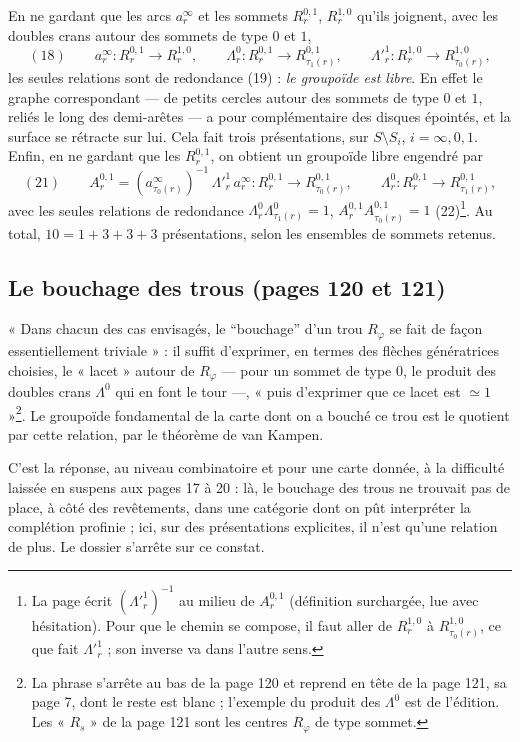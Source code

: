 \documentclass[11pt,a4paper]{article}
\begin{document}
En ne gardant que les arcs $a^\infty_r$ et les sommets $R^{0,1}_r$,
$R^{1,0}_r$ qu'ils joignent, avec les doubles crans autour des sommets de type
$0$ et $1$,
\[
(18)\qquad a^\infty_r : R^{0,1}_r \to R^{1,0}_r, \qquad \Lambda^0_r : R^{0,1}_r \to R^{0,1}_{\tau_1(r)}, \qquad \Lambda'^1_r : R^{1,0}_r \to R^{1,0}_{\tau_0(r)},
\]
les seules relations sont de redondance (19) : \emph{le groupoïde est libre}.
En effet le graphe correspondant — de petits cercles autour des sommets de type
$0$ et $1$, reliés le long des demi-arêtes — a pour complémentaire des disques
épointés, et la surface se rétracte sur lui. Cela fait trois présentations, sur
$S \setminus S_i$, $i = \infty, 0, 1$. Enfin, en ne gardant que les
$R^{0,1}_r$, on obtient un groupoïde libre engendré par
\[
(21)\qquad A^{0,1}_r = (a^\infty_{\tau_0(r)})^{-1}\,\Lambda'^1_r\,a^\infty_r : R^{0,1}_r \to R^{0,1}_{\tau_0(r)}, \qquad \Lambda^0_r : R^{0,1}_r \to R^{0,1}_{\tau_1(r)},
\]
avec les seules relations de redondance $\Lambda^0_r\Lambda^0_{\tau_1(r)} = 1$,
$A^{0,1}_r A^{0,1}_{\tau_0(r)} = 1$ (22)\footnote{La page écrit
$(\Lambda'^1_r)^{-1}$ au milieu de $A^{0,1}_r$ (définition surchargée, lue
avec hésitation). Pour que le chemin se compose, il faut aller de $R^{1,0}_r$
à $R^{1,0}_{\tau_0(r)}$, ce que fait $\Lambda'^1_r$ ; son inverse va dans
l'autre sens.}. Au total, $10 = 1 + 3 + 3 + 3$ présentations, selon les
ensembles de sommets retenus.

\subsection*{Le bouchage des trous (pages 120 et 121)}

« Dans chacun des cas envisagés, le “bouchage” d'un trou $R_\varphi$ se fait de
façon essentiellement triviale » : il suffit d'exprimer, en termes des flèches
génératrices choisies, le « lacet » autour de $R_\varphi$ — pour un sommet de
type $0$, le produit des doubles crans $\Lambda^0$ qui en font le tour —,
« puis d'exprimer que ce lacet est $\simeq 1$ »\footnote{La phrase s'arrête au
bas de la page 120 et reprend en tête de la page 121, sa page 7, dont le reste
est blanc ; l'exemple du produit des $\Lambda^0$ est de l'édition. Les
« $R_s$ » de la page 121 sont les centres $R_\varphi$ de type sommet.}. Le
groupoïde fondamental de la carte dont on a bouché ce trou est le quotient par
cette relation, par le théorème de van Kampen.

C'est la réponse, au niveau combinatoire et pour une carte donnée, à la
difficulté laissée en suspens aux pages 17 à 20 : là, le bouchage des trous ne
trouvait pas de place, à côté des revêtements, dans une catégorie dont on
pût interpréter la complétion profinie ; ici, sur des présentations
explicites, il n'est qu'une relation de plus. Le dossier s'arrête sur ce
constat.
\end{document}
